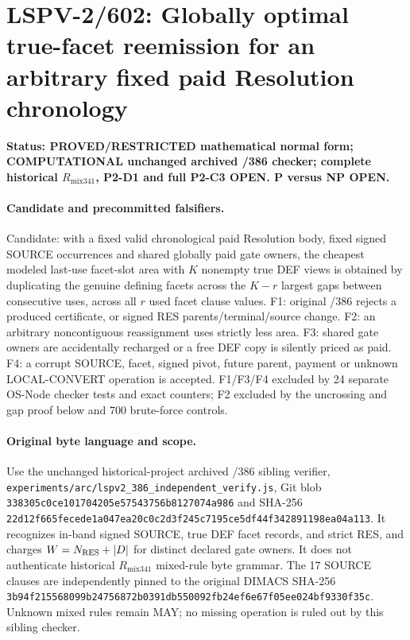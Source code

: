 \section*{LSPV-2/602: Globally optimal true-facet reemission for an arbitrary fixed paid Resolution chronology}
\textbf{Status: PROVED/RESTRICTED mathematical normal form; COMPUTATIONAL unchanged archived /386 checker; complete historical $R_{\mathrm{mix341}}$, P2-D1 and full P2-C3 OPEN. P versus NP OPEN.}

\paragraph{Candidate and precommitted falsifiers.}
Candidate: with a fixed valid chronological paid Resolution body, fixed signed SOURCE occurrences and shared globally paid gate owners, the cheapest modeled last-use facet-slot area with $K$ nonempty true DEF views is obtained by duplicating the genuine defining facets across the $K-r$ largest gaps between consecutive uses, across all $r$ used facet clause values. F1: original /386 rejects a produced certificate, or signed RES parents/terminal/source change. F2: an arbitrary noncontiguous reassignment uses strictly less area. F3: shared gate owners are accidentally recharged or a free DEF copy is silently priced as paid. F4: a corrupt SOURCE, facet, signed pivot, future parent, payment or unknown LOCAL-CONVERT operation is accepted. F1/F3/F4 excluded by 24 separate OS-Node checker tests and exact counters; F2 excluded by the uncrossing and gap proof below and 700 brute-force controls.

\paragraph{Original byte language and scope.}
Use the unchanged historical-project archived /386 sibling verifier, \texttt{experiments/arc/lspv2\_386\_independent\_verify.js}, Git blob \texttt{338305c0ce101704205e57543756b8127074a986} and SHA-256 \texttt{22d12f665fecede1a047ea20c0c2d3f245c7195ce5df44f342891198ea04a113}. It recognizes in-band signed SOURCE, true DEF facet records, and strict RES, and charges $W=N_{\rm RES}+|D|$ for distinct declared gate owners. It does not authenticate historical $R_{\mathrm{mix341}}$ mixed-rule byte grammar. The 17 SOURCE clauses are independently pinned to the original DIMACS SHA-256 \texttt{3b94f215568099b24756872b0391db550092fb24ef6e67f05ee024bf9330f35c}. Unknown mixed rules remain MAY; no missing operation is ruled out by this sibling checker.

